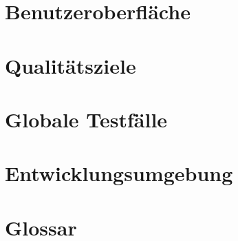 \documentclass[a4paper, 11pt]{article}
\begin{document}
\section{Benutzeroberfläche}

\section{Qualitätsziele}

\section{Globale Testfälle}

\section{Entwicklungsumgebung}

\section{Glossar}
\end{document}
